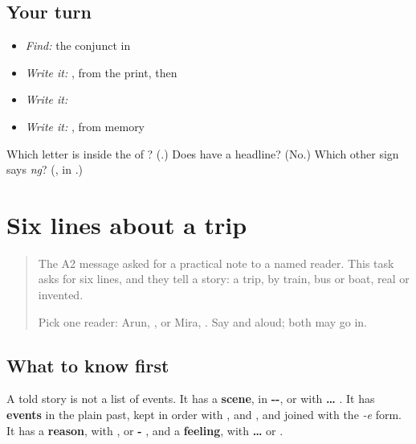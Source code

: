 \subsection*{Your turn}
\begin{itemize}
\raggedright
  \item \emph{Find:} the conjunct  in \textbf{}
  \item \emph{Write it:} , from the print, then \textbf{}
  \item \emph{Write it:} \textbf{}
  \item \emph{Write it:} \textbf{}, from memory
\end{itemize}

\begin{tcolorbox}[breakable,colback=teal!4,colframe=teal!35!black,title={Before you move on}]
Which letter is inside the \textbf{} of \textbf{}? (\textbf{}.) Does \textbf{} have a headline? (No.) Which other sign says \emph{ng}? (\textbf{}, in \textbf{}.)
\end{tcolorbox}
\section[(six lines)]{Six lines about a trip}

\label{lesson:BN-W275-six-lines}



\begin{quote}
The A2 message asked for a practical note to a named reader. This task asks for six lines, and they tell a story: a trip, by train, bus or boat, real or invented.

Pick one reader: Arun, \textbf{}, or Mira, \textbf{}. Say \textbf{} and \textbf{} aloud; both may go in.
\end{quote}

\subsection*{What to know first}
A told story is not a list of events. It has a \textbf{scene}, in \textbf{--}, or with \textbf{ … }. It has \textbf{events} in the plain past, kept in order with \textbf{}, \textbf{} and \textbf{}, and joined with the \emph{-e} form. It has a \textbf{reason}, with \textbf{}, \textbf{} or \textbf{- }, and a \textbf{feeling}, with \textbf{ … } or \textbf{ }.

